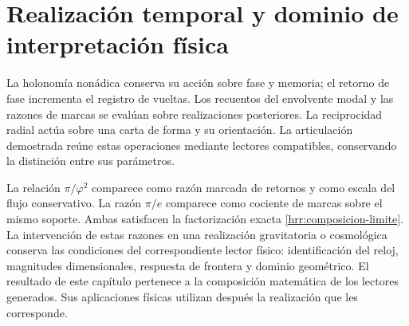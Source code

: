 \section{Realización temporal y dominio de interpretación física}

La holonomía nonádica conserva su acción sobre fase y memoria; el retorno
de fase incrementa el registro de vueltas. Los recuentos del envolvente
modal y las razones de marcas se evalúan sobre realizaciones posteriores.
La reciprocidad radial actúa sobre una carta de forma y su orientación.
La articulación demostrada reúne estas operaciones mediante lectores
compatibles, conservando la distinción entre sus parámetros.

La relación \(\pi/\varphi^2\) comparece como razón marcada de retornos
y como escala del flujo conservativo. La razón \(\pi/e\) comparece
como cociente de marcas sobre el mismo soporte. Ambas satisfacen la
factorización exacta \eqref{hrr:composicion-limite}. La intervención
de estas razones en una realización gravitatoria o cosmológica conserva
las condiciones del correspondiente lector físico: identificación del
reloj, magnitudes dimensionales, respuesta de frontera y dominio geométrico.
El resultado de este capítulo pertenece a la composición matemática de
los lectores generados. Sus aplicaciones físicas utilizan después la
realización que les corresponde.

